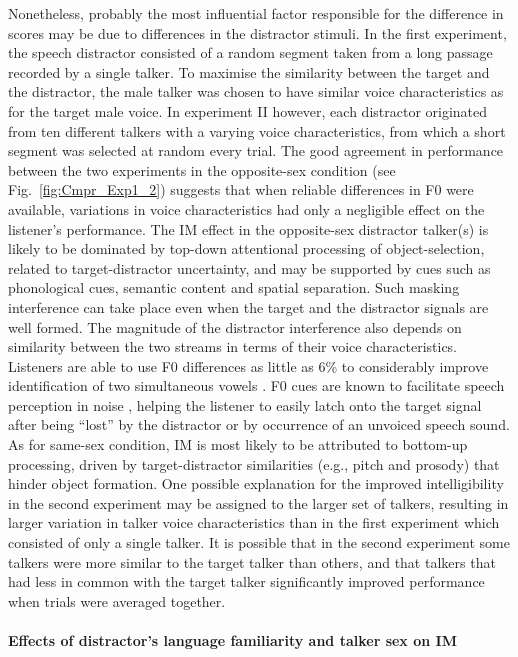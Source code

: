 \documentclass[a4paper, twoside]{templates/ociamthesis}
\begin{document}
Nonetheless, probably the most influential factor responsible for the difference in scores may be due to differences in the distractor stimuli. In the first experiment, the speech distractor consisted of a random segment taken from a long passage recorded by a single talker. To maximise the similarity between the target and the distractor, the male talker was chosen to have similar voice characteristics as for the target male voice. In experiment II however, each distractor originated from ten different talkers with a varying voice characteristics, from which a short segment was selected at random every trial. The good agreement in performance between the two experiments in the opposite-sex condition (see Fig.~\ref{fig:Cmpr_Exp1_2}) suggests that when reliable differences in F0 were available, variations in voice characteristics had only a negligible effect on the listener's performance. The IM effect in the opposite-sex distractor talker(s) is likely to be dominated by top-down attentional processing of object-selection, related to target-distractor uncertainty, and may be supported by cues such as phonological cues, semantic content and spatial separation. Such masking interference can take place even when the target and the distractor signals are well formed. The magnitude of the distractor interference also depends on similarity between the two streams in terms of their voice characteristics. Listeners are able to use F0 differences as little as 6\% to considerably improve identification of two simultaneous vowels \autocite{Brokx1982}. F0 cues are known to facilitate speech perception in noise \autocites[e.g.,][]{Binns2007,Miller2010}, helping the listener to easily latch onto the target signal after being ``lost'' by the distractor or by occurrence of an unvoiced speech sound. As for same-sex condition, IM is most likely to be attributed to bottom-up processing, driven by target-distractor similarities (e.g., pitch and prosody) that hinder object formation. One possible explanation for the improved intelligibility in the second experiment may be assigned to the larger set of talkers, resulting in larger variation in talker voice characteristics than in the first experiment which consisted of only a single talker. It is possible that in the second experiment some talkers were more similar to the target talker than others, and that talkers that had less in common with the target talker significantly improved performance when trials were averaged together.\\

\hypertarget{effects-of-distractors-language-familiarity-and-talker-sex-on-im}{%
\paragraph{Effects of distractor's language familiarity and talker sex on IM}\label{effects-of-distractors-language-familiarity-and-talker-sex-on-im}}
\end{document}
